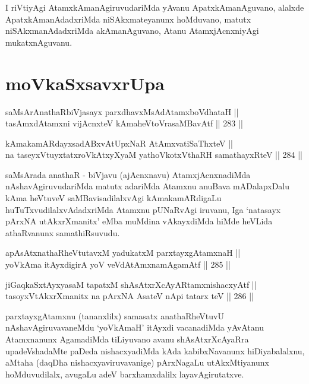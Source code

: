 \begin{artha}
I riVtiyAgi AtamxkAmanAgiruvudariMda yAvanu ApatxkAmanAguvano, alalxde
ApatxkAmanAdadxriMda niSAkxmateyanunx hoMduvano, matutx
niSAkxmanAdadxriMda akAmanAguvano, Atanu AtamxjAcnxniyAgi
mukatxnAguvanu.
\end{artha}


\section*{moVkaSxsavxrUpa}

\begin{shl}
saMsArAnathaRbiVjasayx parxdhavxMsAdAtamxboVdhataH || \\
tasAmxdAtamxni vijAcnxteV kAmaheVtoVrasaMBavAtf ||  283 ||  
\end{shl}

\begin{shl}
kAmakamARdayxsadABxvAtUpxNaR AtAmx\s vatiSaThxteV ||  \\
na taseyxVtuyxtatxroVkAtxyX\s yaM yathoVkotxV\s thaRH samathayxRteV ||  284 ||  
\end{shl}

\begin{artha}
saMsArada anathaR - biVjavu (ajAcnxnavu) AtamxjAcnxnadiMda
nAshavAgiruvudariMda matutx adariMda Atamxnu anuBava mADalapxDalu kAma
heVtuveV saMBavisadilalxvAgi kAmakamARdigaLu huTuTxvudilalxvAdadxriMda
Atamxnu pUNaRvAgi iruvanu, Iga `natasayx pArxNA utAkxrXmanitx' eMba
muMdina vAkayxdiMda hiMde heVLida athaRvanunx samathiRsuvudu.
\end{artha}

\begin{shl}
apAsAtxnathaRheVtutavxM yadukatxM parxtayxgAtamxnaH || \\
yoV\s kAma itAyxdigirA yoV veVdA\s \s tAmxnamAgamAtf ||  285 ||  
\end{shl}

\begin{shl}
jiGaqkaSxtAyxyasaM tapatxM shAsAtxrXcAyARtamxnishacxyAtf ||  \\
tasoyxVtAkxrXmanitx na pArxNA AsateV nApi tatarx teV ||  286 ||  
\end{shl}

\begin{artha}
parxtayxgAtamxnu (tananxlilx) samasatx anathaRheVtuvU
nAshavAgiruvavaneMdu `yoV\s kAmaH' itAyxdi vacanadiMda yAvAtanu
Atamxnanunx AgamadiMda tiLiyuvano avanu shAsAtxrXcAyaRra
upadeVshadaMte paDeda nishacxyadiMda kAda kabibxNavanunx
hiDiyabalalxnu, aMtaha (daqDha nishacxyaviruvavanige) pArxNagaLu
utAkxMtiyanunx hoMduvudilalx, avugaLu adeV barxhamxdalilx
layavAgirutatxve.
\end{artha}

